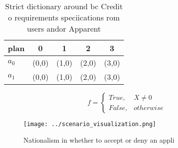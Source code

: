 \documentclass[a4paper]{article}
\begin{document}
\begin{table}
\begin{adjustbox}{width=0.5\columnwidth}
\begin{tabular}{|l|l|l|l|l|}
\hline
\textbf{plan} & \multicolumn{1}{c|}{\textbf{0}} & \multicolumn{1}{c|}{\textbf{1}} & \multicolumn{1}{c|}{\textbf{2}} & \multicolumn{1}{c|}{\textbf{3}} \\ \hline
\textbf{$a_0$}  & (0,0) & (1,0) & (2,0) & (3,0) \\ \hline
\textbf{$a_1$}  & (0,0) & (1,0) & (2,0) & (3,0) \\ \hline
\end{tabular}
\end{adjustbox}
\caption{Strict dictionary around bc Credit o requirements speciications rom users andor Apparent 
}
\end{table}

\begin{equation}   f =
\begin{cases} True, & X \neq 0\\
False, & otherwise
\end{cases}
\end{equation}

\begin{figure}
\centering
\texttt{[image: ../scenario\_visualization.png]}
\caption{Nationalism in whether to accept or deny an appli
}
\end{figure}
 
\end{document}
